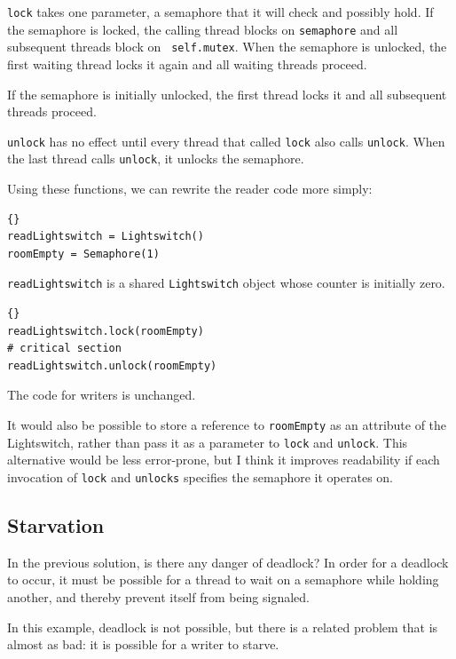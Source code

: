 \documentclass{book}
\begin{document}
{\tt lock} takes one parameter, a semaphore that it will check and
possibly hold.  If the semaphore is locked, the calling thread blocks
on {\tt semaphore} and all subsequent threads block on {\tt
self.mutex}.  When the semaphore is unlocked, the first waiting thread
locks it again and all waiting threads proceed.

If the semaphore is initially unlocked, the first thread locks it
and all subsequent threads proceed.

{\tt unlock} has no effect until every thread that called {\tt lock}
also calls {\tt unlock}.  When the last thread calls {\tt unlock}, it
unlocks the semaphore.

\newpage
Using these functions, we can rewrite the reader code
more simply:

\begin{lstlisting}[title={Readers-writers initialization}]{}
readLightswitch = Lightswitch()
roomEmpty = Semaphore(1)
\end{lstlisting}

{\tt readLightswitch} is a shared {\tt Lightswitch} object whose counter
is initially zero.

\begin{lstlisting}[title={Readers-writers solution (reader)}]{}
readLightswitch.lock(roomEmpty)
# critical section
readLightswitch.unlock(roomEmpty)
\end{lstlisting}

The code for writers is unchanged.

It would also be possible to store a reference to {\tt roomEmpty}
as an attribute of the Lightswitch, rather than pass it as a parameter
to {\tt lock} and {\tt unlock}.  This alternative would be less
error-prone, but I think it improves readability if each invocation
of {\tt lock} and {\tt unlocks} specifies the semaphore it operates on.

\subsection{Starvation}

In the previous solution, is there any danger of deadlock?
In order for a deadlock to occur, it must be possible for a
thread to wait on a semaphore while holding another, and thereby
prevent itself from being signaled.

In this example, deadlock is not possible, but there is a related
problem that is almost as bad: it is possible for a writer to
starve.
\end{document}
